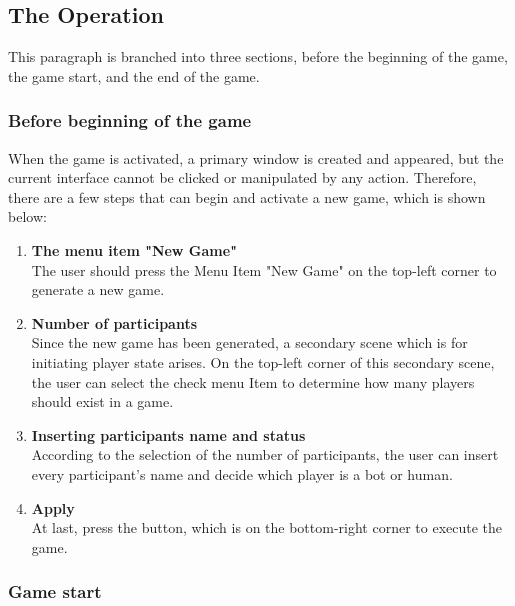 \subsection{The Operation}

This paragraph is branched into three sections, before the beginning of the game, the game start, and the end of the game. 

\subsubsection{Before beginning of the game}
When the game is activated, a primary window is created and appeared, but the current interface cannot be clicked or manipulated by any action. Therefore, there are a few steps that can begin and activate a new game, which is shown below: 

\begin{enumerate}
	\item\textbf{The menu item "New Game"}\\
	The user should press the Menu Item "New Game" on the top-left corner to generate a new game.
	
	\item\textbf{Number of participants}\\
	Since the new game has been generated, a secondary scene which is for initiating player state arises. On the top-left corner of this secondary scene, the user can select the check menu Item to determine how many players should exist in a game. 
	
	\item\textbf{Inserting participants name and status}\\
    According to the selection of the number of participants, the user can insert every participant's name and decide which player is a bot or human.
	
	\item\textbf{Apply}\\
	At last, press the button, which is on the bottom-right corner to execute the game.
	
\end{enumerate}

\subsubsection{Game start}


